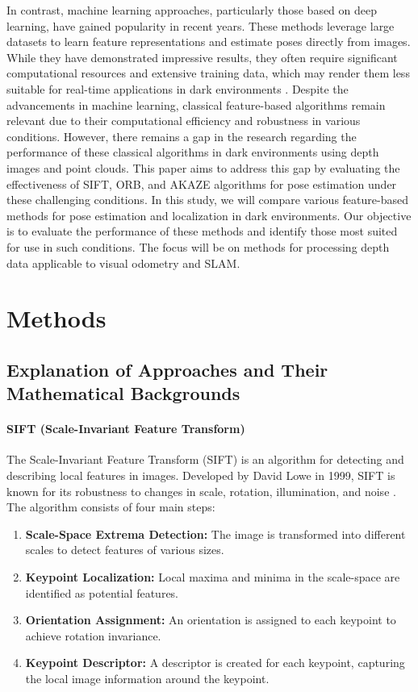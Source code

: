 \documentclass[conference, a4paper]{IEEEtran}
\begin{document}
In contrast, machine learning approaches, particularly those based on deep learning, have gained popularity in recent years. These methods leverage large datasets to learn feature representations and estimate poses directly from images. While they have demonstrated impressive results, they often require significant computational resources and extensive training data, which may render them less suitable for real-time applications in dark environments \cite{arxiv2, arxiv3}.
Despite the advancements in machine learning, classical feature-based algorithms remain relevant due to their computational efficiency and robustness in various conditions. However, there remains a gap in the research regarding the performance of these classical algorithms in dark environments using depth images and point clouds. This paper aims to address this gap by evaluating the effectiveness of SIFT, ORB, and AKAZE algorithms for pose estimation under these challenging conditions.
In this study, we will compare various feature-based methods for pose estimation and localization in dark environments. Our objective is to evaluate the performance of these methods and identify those most suited for use in such conditions. The focus will be on methods for processing depth data applicable to visual odometry and SLAM.


\section{Methods}

\subsection{Explanation of Approaches and Their Mathematical Backgrounds}

\paragraph{SIFT (Scale-Invariant Feature Transform)}
The Scale-Invariant Feature Transform (SIFT) is an algorithm for detecting and describing local features in images. Developed by David Lowe in 1999, SIFT is known for its robustness to changes in scale, rotation, illumination, and noise \cite{sift}. The algorithm consists of four main steps:
\begin{enumerate}
	\item \textbf{Scale-Space Extrema Detection:} The image is transformed into different scales to detect features of various sizes.
	\item \textbf{Keypoint Localization:} Local maxima and minima in the scale-space are identified as potential features.
	\item \textbf{Orientation Assignment:} An orientation is assigned to each keypoint to achieve rotation invariance.
	\item \textbf{Keypoint Descriptor:} A descriptor is created for each keypoint, capturing the local image information around the keypoint.
\end{enumerate}
\end{document}
